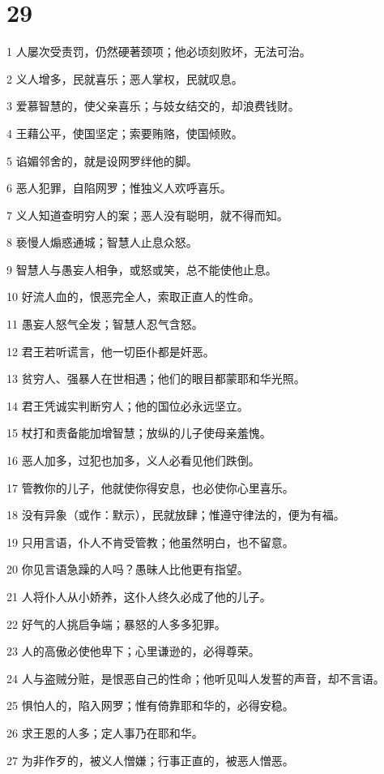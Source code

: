 \chapter{29}

\par 1 人屡次受责罚，仍然硬著颈项；他必顷刻败坏，无法可治。
\par 2 义人增多，民就喜乐；恶人掌权，民就叹息。
\par 3 爱慕智慧的，使父亲喜乐；与妓女结交的，却浪费钱财。
\par 4 王藉公平，使国坚定；索要贿赂，使国倾败。
\par 5 谄媚邻舍的，就是设网罗绊他的脚。
\par 6 恶人犯罪，自陷网罗；惟独义人欢呼喜乐。
\par 7 义人知道查明穷人的案；恶人没有聪明，就不得而知。
\par 8 亵慢人煽惑通城；智慧人止息众怒。
\par 9 智慧人与愚妄人相争，或怒或笑，总不能使他止息。
\par 10 好流人血的，恨恶完全人，索取正直人的性命。
\par 11 愚妄人怒气全发；智慧人忍气含怒。
\par 12 君王若听谎言，他一切臣仆都是奸恶。
\par 13 贫穷人、强暴人在世相遇；他们的眼目都蒙耶和华光照。
\par 14 君王凭诚实判断穷人；他的国位必永远坚立。
\par 15 杖打和责备能加增智慧；放纵的儿子使母亲羞愧。
\par 16 恶人加多，过犯也加多，义人必看见他们跌倒。
\par 17 管教你的儿子，他就使你得安息，也必使你心里喜乐。
\par 18 没有异象（或作：默示），民就放肆；惟遵守律法的，便为有福。
\par 19 只用言语，仆人不肯受管教；他虽然明白，也不留意。
\par 20 你见言语急躁的人吗？愚昧人比他更有指望。
\par 21 人将仆人从小娇养，这仆人终久必成了他的儿子。
\par 22 好气的人挑启争端；暴怒的人多多犯罪。
\par 23 人的高傲必使他卑下；心里谦逊的，必得尊荣。
\par 24 人与盗贼分赃，是恨恶自己的性命；他听见叫人发誓的声音，却不言语。
\par 25 惧怕人的，陷入网罗；惟有倚靠耶和华的，必得安稳。
\par 26 求王恩的人多；定人事乃在耶和华。
\par 27 为非作歹的，被义人憎嫌；行事正直的，被恶人憎恶。

